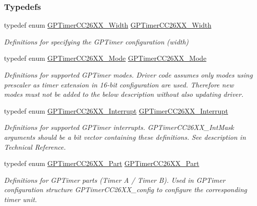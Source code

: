 \subsubsection*{Typedefs}
\begin{DoxyCompactItemize}
\item 
typedef enum \hyperlink{_g_p_timer_c_c26_x_x_8h_a37f7594eb4084eff43d5b80bb6418ec7}{G\+P\+Timer\+C\+C26\+X\+X\+\_\+\+Width} \hyperlink{_g_p_timer_c_c26_x_x_8h_aeb2b955f6dda2b101294c7b521e715b4}{G\+P\+Timer\+C\+C26\+X\+X\+\_\+\+Width}
\begin{DoxyCompactList}\small\item\em Definitions for specifying the G\+P\+Timer configuration (width) \end{DoxyCompactList}\item 
typedef enum \hyperlink{_g_p_timer_c_c26_x_x_8h_ac3f0539fd948c59b31df04dff5b7024c}{G\+P\+Timer\+C\+C26\+X\+X\+\_\+\+Mode} \hyperlink{_g_p_timer_c_c26_x_x_8h_a13c88da09d4f9806f5555690bf2e3a49}{G\+P\+Timer\+C\+C26\+X\+X\+\_\+\+Mode}
\begin{DoxyCompactList}\small\item\em Definitions for supported G\+P\+Timer modes. Driver code assumes only modes using prescaler as timer extension in 16-\/bit configuration are used. Therefore new modes must not be added to the below description without also updating driver. \end{DoxyCompactList}\item 
typedef enum \hyperlink{_g_p_timer_c_c26_x_x_8h_a1e0397cdf2412358dfdf0eb0df40db92}{G\+P\+Timer\+C\+C26\+X\+X\+\_\+\+Interrupt} \hyperlink{_g_p_timer_c_c26_x_x_8h_aa4cc2366361f3ae2d3438d4496e6b184}{G\+P\+Timer\+C\+C26\+X\+X\+\_\+\+Interrupt}
\begin{DoxyCompactList}\small\item\em Definitions for supported G\+P\+Timer interrupts. G\+P\+Timer\+C\+C26\+X\+X\+\_\+\+Int\+Mask arguments should be a bit vector containing these definitions. See description in Technical Reference. \end{DoxyCompactList}\item 
typedef enum \hyperlink{_g_p_timer_c_c26_x_x_8h_aff5462fa33c306f2c8bd29284fd898b0}{G\+P\+Timer\+C\+C26\+X\+X\+\_\+\+Part} \hyperlink{_g_p_timer_c_c26_x_x_8h_a7067a38f9de14af167de8df90dfb18d3}{G\+P\+Timer\+C\+C26\+X\+X\+\_\+\+Part}
\begin{DoxyCompactList}\small\item\em Definitions for G\+P\+Timer parts (Timer A / Timer B). Used in G\+P\+Timer configuration structure G\+P\+Timer\+C\+C26\+X\+X\+\_\+config to configure the corresponding timer unit. \end{DoxyCompactList}\item 

\end{DoxyCompactItemize}
